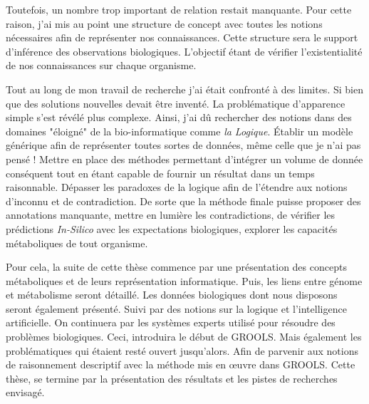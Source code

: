 \begin{refsection}
Toutefois, un nombre trop important de relation restait manquante. Pour cette raison, j'ai mis au point une structure de concept avec toutes les notions nécessaires afin de représenter nos connaissances. Cette structure sera le support d'inférence des observations biologiques. L'objectif étant de vérifier l'existentialité de nos connaissances sur chaque organisme.

Tout au long de mon travail de recherche j'ai était confronté à des limites. Si bien que des solutions nouvelles devait être inventé. La problématique d'apparence simple s'est révélé plus complexe. Ainsi, j'ai dû rechercher des notions dans des domaines "éloigné" de la bio-informatique comme \textit{la Logique}. Établir un modèle générique afin de représenter toutes sortes de données, même celle que je n'ai pas pensé !  Mettre en place des méthodes permettant d'intégrer un volume de donnée conséquent tout en étant capable de fournir un résultat dans un temps raisonnable. Dépasser les paradoxes de la logique afin de l'étendre aux notions d'inconnu et de contradiction. De sorte que la méthode finale puisse proposer des annotations manquante, mettre en lumière les contradictions, de vérifier les prédictions \textit{In-Silico} avec les expectations biologiques, explorer les capacités métaboliques de tout organisme.

Pour cela, la suite de cette thèse commence par une présentation des concepts métaboliques et de leurs représentation informatique. Puis, les liens entre génome et métabolisme seront détaillé. Les données biologiques dont nous disposons seront également présenté. Suivi par des notions sur la logique et l'intelligence artificielle. On continuera par les systèmes experts utilisé pour résoudre des problèmes biologiques. Ceci, introduira le début de GROOLS. Mais également les problématiques qui étaient resté ouvert jusqu'alors. Afin de parvenir aux notions de raisonnement descriptif avec la méthode mis en œuvre dans GROOLS. Cette thèse, se termine par la présentation des résultats et les pistes de recherches envisagé.

\subbibliography
\end{refsection}